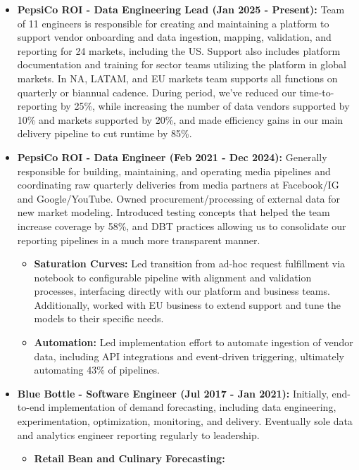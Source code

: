 \documentclass[a4paper,10pt,notitlepage]{article}
\begin{document}
    \begin{itemize}
        \item \textbf{PepsiCo ROI - Data Engineering Lead (Jan 2025 - Present):} Team of 11 engineers is responsible for creating and maintaining a platform to support vendor onboarding and data ingestion, mapping, validation, and reporting for 24 markets, including the US. Support also includes platform documentation and training for sector teams utilizing the platform in global markets. In NA, LATAM, and EU markets team supports all functions on quarterly or biannual cadence. During period, we've reduced our time-to-reporting by 25\%, while increasing the number of data vendors supported by 10\% and markets supported by 20\%, and made efficiency gains in our main delivery pipeline to cut runtime by 85\%.
        \item \textbf{PepsiCo ROI - Data Engineer (Feb 2021 - Dec 2024):} Generally responsible for building, maintaining, and operating media pipelines and coordinating raw quarterly deliveries from media partners at Facebook/IG and Google/YouTube. Owned procurement/processing of external data for new market modeling. Introduced testing concepts that helped the team increase coverage by 58\%, and DBT practices allowing us to consolidate our reporting pipelines in a much more transparent manner.
            \begin{itemize}
                    \item \textbf{Saturation Curves:} Led transition from ad-hoc request fulfillment via notebook to configurable pipeline with alignment and validation processes, interfacing directly with our platform and business teams. Additionally, worked with EU business to extend support and tune the models to their specific needs.
                    \item \textbf{Automation:} Led implementation effort to automate ingestion of vendor data, including API integrations and event-driven triggering, ultimately automating 43\% of pipelines.
            \end{itemize}
        \vspace{-5pt}\item \textbf{Blue Bottle - Software Engineer (Jul 2017 - Jan 2021):} Initially, end-to-end implementation of demand forecasting, including data engineering, experimentation, optimization, monitoring, and delivery. Eventually sole data and analytics engineer reporting regularly to leadership.
            \begin{itemize}
                    \item \textbf{Retail Bean and Culinary Forecasting:}


\end{itemize}
\end{itemize}
\end{document}
